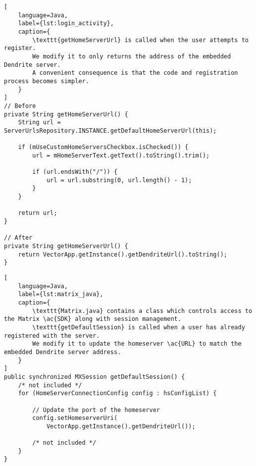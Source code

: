 \begin{lstfloat}
	\begin{lstlisting}[
    language=Java,
    label={lst:login_activity},
    caption={
        \texttt{getHomeServerUrl} is called when the user attempts to register.
        We modify it to only returns the address of the embedded Dendrite server.
        A convenient consequence is that the code and registration process becomes simpler.
    }
]
// Before
private String getHomeServerUrl() {
    String url = ServerUrlsRepository.INSTANCE.getDefaultHomeServerUrl(this);

    if (mUseCustomHomeServersCheckbox.isChecked()) {
        url = mHomeServerText.getText().toString().trim();

        if (url.endsWith("/")) {
            url = url.substring(0, url.length() - 1);
        }
    }

    return url;
}

// After
private String getHomeServerUrl() {
    return VectorApp.getInstance().getDendriteUrl().toString();
}
\end{lstlisting}
\end{lstfloat}

\begin{lstfloat}
	\begin{lstlisting}[
    language=Java,
    label={lst:matrix_java},
    caption={
        \texttt{Matrix.java} contains a class which controls access to the Matrix \ac{SDK} along with session management.
        \texttt{getDefaultSession} is called when a user has already registered with the server.
        We modify it to update the homeserver \ac{URL} to match the embedded Dendrite server address.
    }
]
public synchronized MXSession getDefaultSession() {
    /* not included */
    for (HomeServerConnectionConfig config : hsConfigList) {

        // Update the port of the homeserver
        config.setHomeserverUri(
            VectorApp.getInstance().getDendriteUrl());

        /* not included */
    }
}
\end{lstlisting}
\end{lstfloat}



